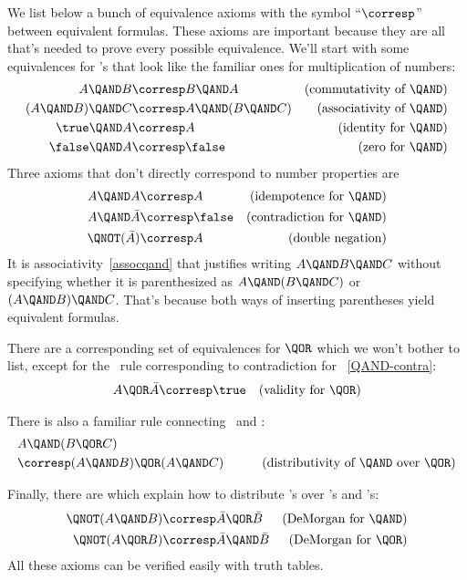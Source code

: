 We list below a bunch of equivalence axioms with the symbol
``$\corresp$'' between equivalent formulas.  These axioms are
important because they are all that's needed to prove every possible
equivalence.  We'll start with some equivalences for \QAND's that look
like the familiar ones for multiplication of numbers:
\begin{align}
A \QAND B           &\corresp B \QAND A
         & \text{(commutativity of \QAND)}\label{commutqand}\\
(A \QAND B)\QAND C  & \corresp A \QAND (B \QAND C)
         & \text{(associativity of \QAND)}\label{assocqand}\\
\true \QAND A           &\corresp A
         & \text{(identity for \QAND)}\notag\\
\false \QAND A           &\corresp \false
         & \text{(zero for \QAND)}\notag
\end{align}
Three axioms that don't directly correspond to number properties are
\begin{align}
A \QAND A       &\corresp A
         & \text{(idempotence for \QAND)}\notag\\
A \QAND \bar{A} & \corresp \false
         & \text{(contradiction for \QAND)}\label{QAND-contra}\\
\QNOT(\bar{A})  & \corresp A
         & \text{(double negation)}\notag
\end{align}
It is associativity~\eqref{assocqand} that justifies writing $A \QAND
B \QAND C$ without specifying whether it is parenthesized as $A \QAND
(B \QAND C)$ or $(A \QAND B) \QAND C$.  That's because both ways of
inserting parentheses yield equivalent formulas.

There are a corresponding set of equivalences for $\QOR$ which we
won't bother to list, except for the \QOR\ rule corresponding to
contradiction for \QAND~\eqref{QAND-contra}:
\begin{align*}
A \QOR \bar{A} & \corresp \true  & \text{(validity for \QOR)}
\end{align*}

There is also a familiar rule connecting \QAND\ and \QOR:
\begin{align}
\lefteqn{A \QAND (B \QOR C)}\notag\\
 & \corresp (A \QAND B) \QOR (A \QAND C) &\qquad \text{(distributivity
  of \QAND\ over \QOR)}\label{qand-distributivity}
\end{align}

Finally, there are  which explain how to
distribute \QNOT's over \QAND's and \QOR's:
\begin{align}
\QNOT(A \QAND B) &\corresp \bar{A} \QOR \bar{B} & \text{(DeMorgan for \QAND)} \label{DeMQAND}\\
\QNOT(A \QOR B) &\corresp \bar{A} \QAND \bar{B} & \text{(DeMorgan for \QOR)}
\label{DeMQOR} 
\end{align}
All these axioms can be verified easily with truth tables.

